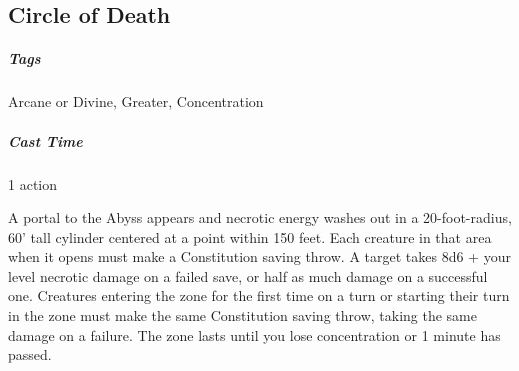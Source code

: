 \subsection{Circle of Death}
\subparagraph*{Tags} Arcane or Divine, Greater, Concentration
\subparagraph*{Cast Time} 1 action

A portal to the Abyss appears and necrotic energy washes out in a 20-foot-radius, 60' tall cylinder centered at a point within 150 feet. Each creature in that area when it opens must make a Constitution saving throw. A target takes 8d6 + your level necrotic damage on a failed save, or half as much damage on a successful one. Creatures entering the zone for the first time on a turn or starting their turn in the zone must make the same Constitution saving throw, taking the same damage on a failure. The zone lasts until you lose concentration or 1 minute has passed.










